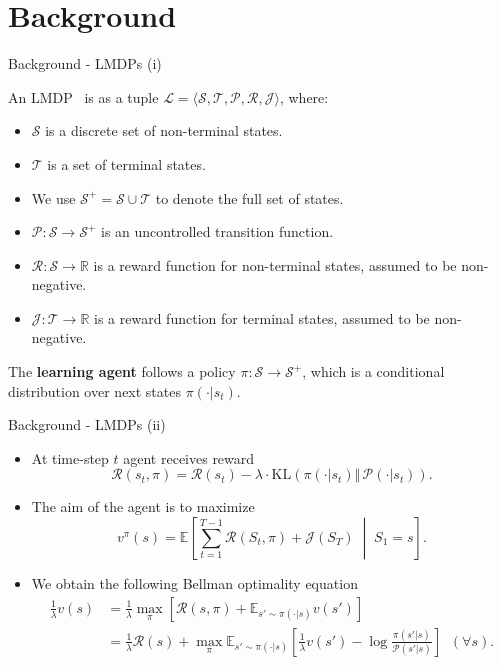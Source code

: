 \documentclass{beamer}
\theoremstyle{mystyle}
\newcommand{\cJ}{\mathcal{J}}
\newcommand{\cL}{\mathcal{L}}
\newcommand{\cP}{\mathcal{P}}
\newcommand{\cR}{\mathcal{R}}
\newcommand{\cS}{\mathcal{S}}
\newcommand{\cT}{\mathcal{T}}
\newcommand{\EEc}[2]{\mathbb{E}\left[#1\;\middle\lvert\;#2\right]}
\newcommand{\real}{\mathbb{R}}
\begin{document}
\section{Background}
\begin{frame}{Background - LMDPs (i)}

    An LMDP~\citep{KappenML2012,TodorovNIPS2007} is as a tuple $\cL=\langle\cS,\cT,\cP,\cR,\cJ\rangle$, where:
    
    \begin{itemize}
        \item  $\cS$ is a discrete set of non-terminal states.
        \item $\cT$ is a set of terminal states.
        \item We use $\cS^+=\cS\cup\cT$ to denote the full set of states.
        \item $\cP:\cS\rightarrow\cS^+$ is an uncontrolled transition function.
        \item $\cR:\cS\rightarrow\real$ is a reward function for non-terminal states, assumed to be non-negative.
        \item $\cJ:\cT\rightarrow\real$ is a reward function for terminal states, assumed to be non-negative.

    \end{itemize}
    

  

    The \textbf{learning agent} follows a policy $\pi:\cS\rightarrow\cS^+$, which is a conditional distribution over next states $\pi(\cdot | s_t)$.
\end{frame}


\begin{frame}{Background - LMDPs (ii)}
    
    \begin{itemize}

        \item At time-step $t$ agent receives reward \[ \cR(s_t,\pi) = \cR(s_t) - \lambda\cdot\mathrm{KL}(\pi(\cdot|s_t)\Vert\, \cP(\cdot|s_t)). \]

        \item The aim of the agent is to maximize \[ v^\pi(s) = \EEc{\sum_{t=1}^{T-1} \cR(S_t,\pi) + \cJ(S_T)}{S_1 = s}.\]
        
       \item We obtain the following Bellman optimality equation 
       \begin{align*}
            \frac 1 \lambda v(s) &= \frac 1 \lambda \max_\pi \left[ \cR(s,\pi) + \mathbb{E}_{s'\sim\pi(\cdot|s)} v(s') \right]\\
             &= \frac 1 \lambda \cR(s) + \max_\pi \mathbb{E}_{s'\sim\pi(\cdot|s)} \left[ \frac 1 \lambda v(s') - \log \frac {\pi(s'|s)} {\cP(s'|s)} \right] \;\; (\forall s).
        \end{align*}

    \end{itemize}
\end{frame}
\end{document}
